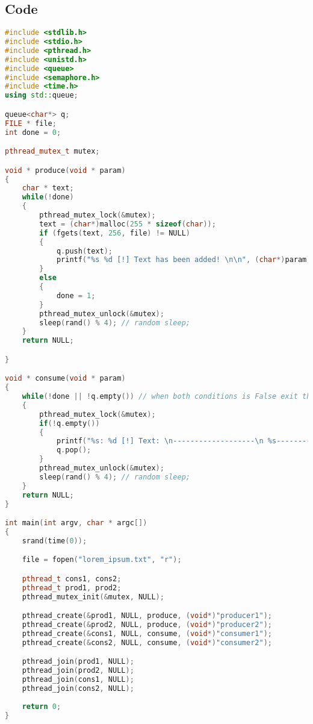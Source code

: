\documentclass{article}
\begin{document}
\subsection{Code}
\begin{lstlisting}[language=C++]
#include <stdlib.h>
#include <stdio.h>
#include <pthread.h>
#include <unistd.h>
#include <queue>
#include <semaphore.h>
#include <time.h>
using std::queue;

queue<char*> q;
FILE * file;
int done = 0;

pthread_mutex_t mutex;

void * produce(void * param)
{
	char * text;
	while(!done)
	{
		pthread_mutex_lock(&mutex);
		text = (char*)malloc(255 * sizeof(char));
		if (fgets(text, 256, file) != NULL)
		{
			q.push(text);
			printf("%s %d [!] Text has been added! \n\n", (char*)param, pthread_self());
		}
		else
		{
			done = 1;
		}
		pthread_mutex_unlock(&mutex);
		sleep(rand() % 4); // random sleep;
	}
	return NULL;

}

void * consume(void * param)
{
	while(!done || !q.empty()) // when both conditions is False exit the loop;
	{
		pthread_mutex_lock(&mutex);
		if(!q.empty())
		{
			printf("%s: %d [!] Text: \n-------------------\n %s--------------------\n",(char*)param , pthread_self(), q.front());
			q.pop();
		}
		pthread_mutex_unlock(&mutex);
		sleep(rand() % 4); // random sleep;
	}
	return NULL;
}

int main(int argv, char * argc[])
{
	srand(time(0));

	file = fopen("lorem_ipsum.txt", "r");

	pthread_t cons1, cons2;
	pthread_t prod1, prod2;
	pthread_mutex_init(&mutex, NULL);

	pthread_create(&prod1, NULL, produce, (void*)"producer1");
	pthread_create(&prod2, NULL, produce, (void*)"producer2");
	pthread_create(&cons1, NULL, consume, (void*)"consumer1");
	pthread_create(&cons2, NULL, consume, (void*)"consumer2");

	pthread_join(prod1, NULL);
	pthread_join(prod2, NULL);
	pthread_join(cons1, NULL);
	pthread_join(cons2, NULL);
	
	return 0;
}
\end{lstlisting}
\end{document}
